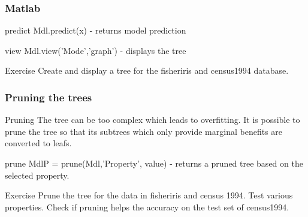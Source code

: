 \documentclass{beamer}
\begin{document}
\begin{frame}
\frametitle{Matlab}

\begin{block}{predict}
Mdl.predict(x) - returns model prediction
\end{block}

\begin{block}{view}
Mdl.view('Mode','graph') - displays the tree
\end{block}

\begin{block}{Exercise}
Create and display a tree for the fisheriris and census1994 database.
\end{block}
\end{frame}

\begin{frame}
\frametitle{Pruning the trees}
\begin{block}{Pruning}
The tree can be too complex which leads to overfitting. It is possible to prune the tree so that its subtrees which only provide marginal benefits are converted to leafs.
\end{block}

\begin{block}{prune}
MdlP = prune(Mdl,'Property', value) - returns a pruned tree based on the selected property.
\end{block}

\begin{block}{Exercise}
Prune the tree for the data in fisheriris and census 1994. Test various properties. Check if pruning helps the accuracy on the test set of census1994.
\end{block}

\end{frame}
\end{document}
